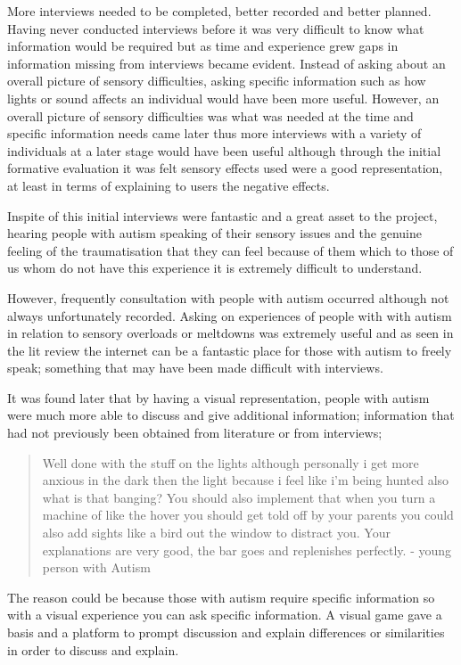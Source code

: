 More interviews needed to be completed, better recorded and better planned. Having never conducted interviews before it was very difficult to know what information would be required but as time and experience grew gaps in information missing from interviews became evident. Instead of asking about an overall picture of sensory difficulties, asking specific information such as how lights or sound affects an individual would have been more useful. However, an overall picture of sensory difficulties was what was needed at the time and specific information needs came later thus more interviews with a variety of individuals at a later stage would have been useful although through the initial formative evaluation it was felt sensory effects used were a good representation, at least in terms of explaining to users the negative effects. 

Inspite of this initial interviews were fantastic and a great asset to the project, hearing people with autism speaking of their sensory issues and the genuine feeling of the traumatisation that they can feel because of them which to those of us whom do not have this experience it is extremely difficult to understand. 

However, frequently consultation with people with autism occurred although not always unfortunately recorded. Asking on experiences of people with with autism in relation to sensory overloads or meltdowns was extremely useful and as seen in the lit review the internet can be a fantastic place for those with autism to freely speak; something that may have been made difficult with interviews.

It was found later that by having a visual representation, people with autism were much more able to discuss and give additional information; information that had not previously been obtained from literature or from interviews; 

\begin{quote}
Well done with the stuff on the lights although personally i get more anxious in the dark then the light because i feel like i'm being hunted also what is that banging? You should also implement that when you turn a machine of like the hover you should get told off by your parents you could also add sights like a bird out the window to distract you. Your explanations are very good, the bar goes and replenishes perfectly. - young person with Autism
\end{quote}

The reason could be because those with autism require specific information so with a visual experience you can ask specific information. A visual game gave a basis and a platform to prompt discussion and explain differences or similarities in order to discuss and explain. 


